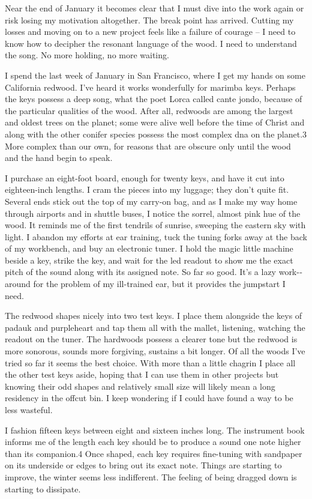 \documentclass[letterpaper,10pt,headsepline]{scrreprt}
\begin{document}
Near the end of January it becomes clear that I must dive into the work again or risk losing my motivation altogether. The break point has arrived. Cutting my losses and moving on to a new project feels like a failure of courage – I need to know how to decipher the resonant language of the wood. I need to understand the song. No more holding, no more waiting.

I spend the last week of January in San Francisco, where I get my hands on some California redwood. I’ve heard it works wonderfully for marimba keys. Perhaps the keys possess a deep song, what the poet Lorca called cante jondo, because of the particular qualities of the wood. After all, redwoods are among the largest and oldest trees on the planet; some were alive well before the time of Christ and along with the other conifer species possess the most complex dna on the planet.3 More complex than our own, for reasons that are obscure only until the wood and the hand begin to speak.

I purchase an eight-­foot board, enough for twenty keys, and have it cut into eighteen-­inch lengths. I cram the pieces into my luggage; they ­don’t quite fit. Several ends stick out the top of my carry-­on bag, and as I make my way home through airports and in shuttle buses, I notice the sorrel, almost pink hue of the wood. It reminds me of the first tendrils of sunrise, sweeping the eastern sky with light.
I abandon my efforts at ear training, tuck the tuning forks away at the back of my workbench, and buy an electronic tuner. I hold the magic little machine beside a key, strike the key, and wait for the led readout to show me the exact pitch of the sound along with its assigned note. So far so good. It’s a lazy work-­around for the problem of my ill-­trained ear, but it provides the jumpstart I need.

The redwood shapes nicely into two test keys. I place them alongside the keys of padauk and purpleheart and tap them all with the mallet, listening, watching the readout on the tuner. The hardwoods possess a clearer tone but the redwood is more sonorous, sounds more forgiving, sustains a bit longer. Of all the woods I’ve tried so far it seems the best choice. With more than a little chagrin I place all the other test keys aside, hoping that I can use them in other projects but knowing their odd shapes and relatively small size will likely mean a long residency in the offcut bin. I keep wondering if I could have found a way to be less wasteful.

I fashion fifteen keys between eight and sixteen inches long. The instrument book informs me of the length each key should be to produce a sound one note higher than its companion.4 Once shaped, each key requires fine-­tuning with sandpaper on its underside or edges to bring out its exact note. Things are starting to improve, the winter seems less indifferent. The feeling of being dragged down is starting to dissipate.
\end{document}
